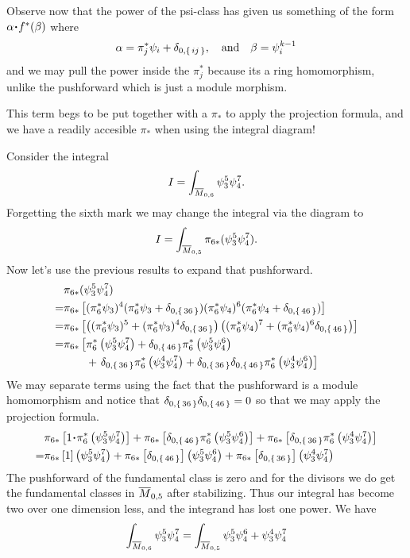 \documentclass[12pt]{memoir}
\begin{document}
Observe now that the power of the psi-class has given us something of the form $\al\.f^\ast(\bt)$ where 
$$\alpha=\pi_j^\ast\psi_i+\delta_{0,\{\,ij\,\}},\quad\text{and}\quad\beta=\psi_i^{k-1}$$
and we may pull the power inside the $\pi_j^\ast$ because its a ring homomorphism, unlike the pushforward which is just a module morphism.\par
This term begs to be put together with a $\pi_\ast$ to apply the projection formula, and we have a readily accesible $\pi_\ast$ when using the integral diagram!

\begin{Ex}
    Consider the integral 
    $$I=\int_{\overline M_{0,6}}\psi_3^5\psi_4^7.$$
    Forgetting the sixth mark we may change the integral via the diagram to
    $$I=\int_{\overline M_{0,5}}\pi_{6\ast}(\psi_3^5\psi_4^7).$$
    Now let's use the previous results to expand that pushforward. 
    \begin{align*}
        &\pi_{6\ast}(\psi_3^5\psi_4^7)\\
        =&\pi_{6\ast}\bonj{(\pi_6^\ast\psi_3)^{4}(\pi_6^\ast\psi_3+\dl_{0,\set{36}})(\pi_6^\ast\psi_4)^{6}(\pi_6^\ast\psi_4+\dl_{0,\set{46}})}\\
        =&\pi_{6\ast}\bonj{\left((\pi_6^\ast\psi_3)^{5}+(\pi_6^\ast\psi_3)^{4}\dl_{0,\set{36}}\right)\left((\pi_6^\ast\psi_4)^{7}+(\pi_6^\ast\psi_4)^{6}\dl_{0,\set{46}}\right)}\\
        =&\pi_{6\ast}\left\lbrack\pi_6^\ast\left(\psi_3^5\psi_4^7\right)+\dl_{0,\set{46}}\pi_6^\ast\left(\psi_3^5\psi_4^6\right)\right.\\
        &\phantom{\pi_{6\ast}\left\lbrack\right.}+\left.\dl_{0,\set{36}}\pi_6^\ast\left(\psi_3^4\psi_4^7\right)+\dl_{0,\set{36}}\dl_{0,\set{46}}\pi_6^\ast\left(\psi_3^4\psi_4^6\right)\right\rbrack
    \end{align*}
    We may separate terms using the fact that the pushforward is a module homomorphism and notice that $\delta_{0,\{\,36\,\}}\delta_{0,\{\,46\,\}}=0$ so that we may apply the projection formula.
    \begin{align*}
        &\pi_{6\ast}\left\lbrack1\.\pi_6^\ast\left(\psi_3^5\psi_4^7\right)\right\rbrack+\pi_{6\ast}\bonj{\dl_{0,\set{46}}\pi_6^\ast\left(\psi_3^5\psi_4^6\right)}+\pi_{6\ast}\bonj{\dl_{0,\set{36}}\pi_6^\ast\left(\psi_3^4\psi_4^7\right)}\\
        =&\pi_{6\ast}\bonj{1}\left(\psi_3^5\psi_4^7\right)+\pi_{6\ast}\bonj{\dl_{0,\set{46}}}\left(\psi_3^5\psi_4^6\right)+\pi_{6\ast}\bonj{\dl_{0,\set{36}}}\left(\psi_3^4\psi_4^7\right)
    \end{align*}
    The pushforward of the fundamental class is zero and for the divisors we do get the fundamental classes in $\overline{M}_{0,5}$ after stabilizing. Thus our integral has become two over one dimension less, and the integrand has lost one power. We have
    $$\int_{\overline M_{0,6}}\psi_3^5\psi_4^7=\int_{\overline{M}_{0,5}}\psi_3^5\psi_4^6+\psi_3^4\psi_4^7$$
\end{Ex}
\end{document}
